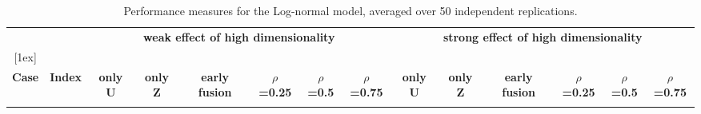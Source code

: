 \begin{table}[!htbp]
\centering
\tiny
\caption{Performance measures for the Log-normal model, averaged over 50 independent replications.}
\label{tab:TableS1}
\begin{tabular}{c|c|cccccc|cccccc}

\multicolumn{1}{c}{} &
\multicolumn{1}{c}{} &
\multicolumn{6}{c}{\bf weak effect of high dimensionality} &
\multicolumn{6}{c}{\bf strong effect of high dimensionality} \\

[1ex]
\hline

& & & & & & & & & & & & & \\

{\bf Case} &
{\bf Index} &
{\bf only U} &
{\bf only Z} &
{\bf early fusion} &
{\bf $\rho$=0.25} &
{\bf $\rho$=0.5} &
{\bf $\rho$=0.75} &
{\bf only U} &
{\bf only Z} &
{\bf early fusion} &
{\bf $\rho$=0.25} &
{\bf $\rho$=0.5} &
{\bf $\rho$=0.75} \\

& & & & & & & & & & & & & \\


\end{tabular}
\end{table}
